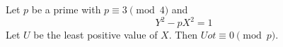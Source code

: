 \begin{proposition}\label{eq:187}
    Let $p$ be a prime with $p\equiv3\pmod4$ and
\[
    Y^2-pX^2=1
\]
    Let $U$ be the least positive value of $X$. Then $U
    ot\equiv0\pmod p$.
\end{proposition}
